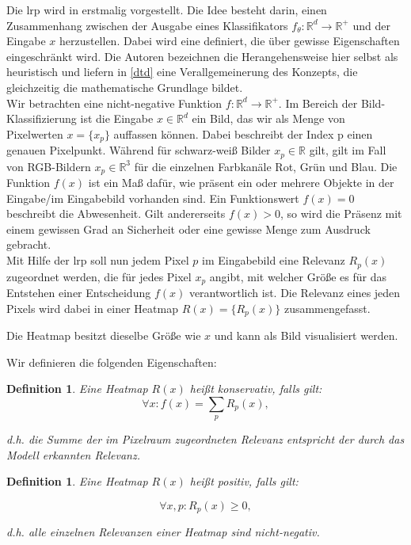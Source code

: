 \documentclass[11pt,a4paper]{article}
\def\emph#1{\textit{#1}}
\newtheorem{definition}[theorem]{Definition}
\numberwithin{equation}{section}
\begin{document}
	Die \gls{lrp} wird in \cite{LRP_first_paper} erstmalig vorgestellt. Die Idee besteht darin, einen Zusammenhang zwischen der Ausgabe eines Klassifikators $f_{\theta}: \mathbb{R}^d\to \mathbb{R^{+}}$ und der Eingabe $x$ herzustellen. Dabei wird eine definiert, die über gewisse Eigenschaften eingeschränkt wird. Die Autoren bezeichnen die Herangehensweise hier selbst als heuristisch und liefern in \ref{dtd} eine Verallgemeinerung des Konzepts, die gleichzeitig die mathematische Grundlage bildet.\\
	
	Wir betrachten eine nicht-negative Funktion $f: \mathbb{R}^d \to \mathbb{R}^{+}$. Im Bereich der Bild-Klassifizierung ist die Eingabe $x \in \mathbb{R}^d$ ein Bild, das wir als Menge von Pixelwerten $x=\lbrace x_p \rbrace$ auffassen können. Dabei beschreibt der Index p einen genauen Pixelpunkt. Während für schwarz-weiß Bilder $x_p \in \mathbb{R}$ gilt, gilt im Fall von RGB-Bildern $x_p \in \mathbb{R}^3$ für die einzelnen Farbkanäle Rot, Grün und Blau. Die Funktion $f(x)$ ist ein Maß dafür, wie präsent ein oder mehrere Objekte in der Eingabe/im Eingabebild vorhanden sind. Ein Funktionswert $f(x)=0$ beschreibt die Abwesenheit. Gilt andererseits $f(x) >0$, so wird die Präsenz mit einem gewissen Grad an Sicherheit oder eine gewisse Menge zum Ausdruck gebracht.\\
	
	Mit Hilfe der \gls{lrp} soll nun jedem Pixel $p$ im Eingabebild eine Relevanz $R_p(x)$ zugeordnet werden, die für jedes Pixel $x_p$ angibt, mit welcher Größe es für das Entstehen einer Entscheidung $f(x)$ verantwortlich ist. Die Relevanz eines jeden Pixels wird dabei in einer Heatmap $R(x) = \lbrace R_p(x) \rbrace$ zusammengefasst.
	
	Die Heatmap besitzt dieselbe Größe wie $x$ und kann als Bild visualisiert werden.
	
	Wir definieren die folgenden Eigenschaften:
	
	\begin{definition}\label{def_konservativ}
		Eine Heatmap $R(x)$ heißt \emph{konservativ}, falls gilt:
		\begin{equation}
		\forall x: f(x) = \sum_p R_p(x),
		\end{equation}
		
		d.h. die Summe der im Pixelraum zugeordneten Relevanz entspricht der durch das Modell erkannten Relevanz.
	\end{definition}
	
	
	\begin{definition} \label{def_pos}
		Eine Heatmap $R(x)$ heißt \emph{positiv}, falls gilt:
		
		\begin{equation}
		\forall x,p: R_p(x) \geq 0,
		\end{equation}
		
		d.h. alle einzelnen Relevanzen einer Heatmap sind nicht-negativ.
		
	\end{definition}
	
\end{document}
